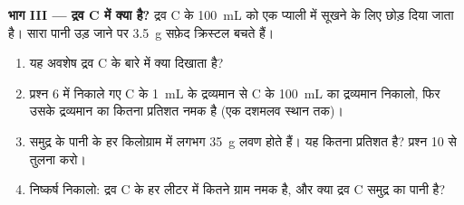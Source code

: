 \begin{problem}
\medskip
\noindent\textbf{भाग III --- द्रव C में क्या है?}
द्रव C के \qty{100}{mL} को एक प्याली में सूखने के लिए छोड़ दिया जाता है। सारा
पानी उड़ जाने पर \qty{3.5}{g} सफ़ेद क्रिस्टल बचते हैं।
\begin{enumerate}[resume]
  \item यह अवशेष द्रव C के बारे में क्या दिखाता है?
  \item प्रश्न 6 में निकाले गए C के \qty{1}{mL} के द्रव्यमान से C के
        \qty{100}{mL} का द्रव्यमान निकालो, फिर उसके द्रव्यमान का कितना
        प्रतिशत नमक है (एक दशमलव स्थान तक)।
  \item समुद्र के पानी के हर किलोग्राम में लगभग \qty{35}{g} लवण होते हैं। यह
        कितना प्रतिशत है? प्रश्न 10 से तुलना करो।
  \item निष्कर्ष निकालो: द्रव C के हर लीटर में कितने ग्राम नमक है, और क्या
        द्रव C समुद्र का पानी है?
\end{enumerate}
\end{problem}
